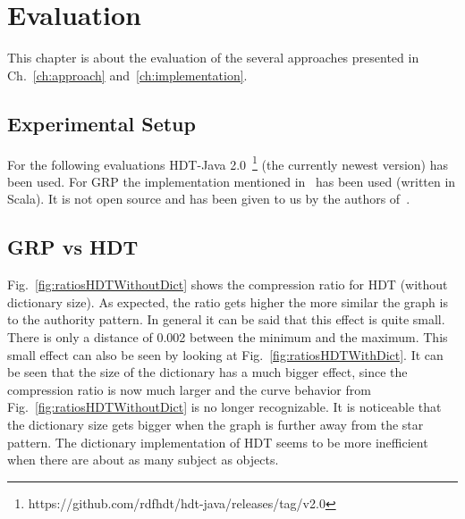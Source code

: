 \chapter{Evaluation}\label{ch:evaluation}

This chapter is about the evaluation of the several approaches presented in Ch.~\ref{ch:approach} and~\ref{ch:implementation}.

\section{Experimental Setup}

For the following evaluations HDT-Java 2.0~\footnote{\label{foot:1}https://github.com/rdfhdt/hdt-java/releases/tag/v2.0} (the currently newest version) has been used. For GRP the implementation mentioned in~\cite{maneth} has been used (written in Scala). It is not open source and has been given to us by the authors of~\cite{maneth}.

\section{GRP vs HDT}\label{sec:evaluationHDTvsGRP}

Fig.~\ref{fig:ratiosHDTWithoutDict} shows the compression ratio for HDT (without dictionary size). As expected, the ratio gets higher the more similar the graph is to the authority pattern. In general it can be said that this effect is quite small. There is only a distance of 0.002 between the minimum and the maximum. This small effect can also be seen by looking at Fig.~\ref{fig:ratiosHDTWithDict}. It can be seen that the size of the dictionary has a much bigger effect, since the compression ratio is now much larger and the curve behavior from Fig.~\ref{fig:ratiosHDTWithoutDict} is no longer recognizable. It is noticeable that the dictionary size gets bigger when the graph is further away from the star pattern. The dictionary implementation of HDT seems to be more inefficient when there are about as many subject as objects. 


